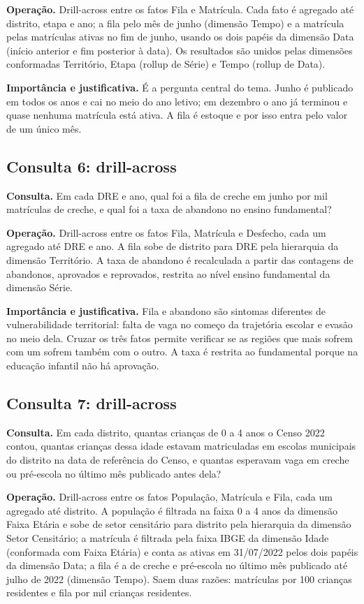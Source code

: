 \documentclass[11pt,a4paper]{article}
\begin{document}
\textbf{Operação.} Drill-across entre os fatos Fila e Matrícula. Cada fato é agregado até distrito, etapa e ano; a fila pelo mês de junho (dimensão Tempo) e a matrícula pelas matrículas ativas no fim de junho, usando os dois papéis da dimensão Data (início anterior e fim posterior à data). Os resultados são unidos pelas dimensões conformadas Território, Etapa (rollup de Série) e Tempo (rollup de Data).

\textbf{Importância e justificativa.} É a pergunta central do tema. Junho é publicado em todos os anos e cai no meio do ano letivo; em dezembro o ano já terminou e quase nenhuma matrícula está ativa. A fila é estoque e por isso entra pelo valor de um único mês.

\subsection{Consulta 6: drill-across}
\textbf{Consulta.} Em cada DRE e ano, qual foi a fila de creche em junho por mil matrículas de creche, e qual foi a taxa de abandono no ensino fundamental?

\textbf{Operação.} Drill-across entre os fatos Fila, Matrícula e Desfecho, cada um agregado até DRE e ano. A fila sobe de distrito para DRE pela hierarquia da dimensão Território. A taxa de abandono é recalculada a partir das contagens de abandonos, aprovados e reprovados, restrita ao nível ensino fundamental da dimensão Série.

\textbf{Importância e justificativa.} Fila e abandono são sintomas diferentes de vulnerabilidade territorial: falta de vaga no começo da trajetória escolar e evasão no meio dela. Cruzar os três fatos permite verificar se as regiões que mais sofrem com um sofrem também com o outro. A taxa é restrita ao fundamental porque na educação infantil não há aprovação.

\subsection{Consulta 7: drill-across}
\textbf{Consulta.} Em cada distrito, quantas crianças de 0 a 4 anos o Censo 2022 contou, quantas crianças dessa idade estavam matriculadas em escolas municipais do distrito na data de referência do Censo, e quantas esperavam vaga em creche ou pré-escola no último mês publicado antes dela?

\textbf{Operação.} Drill-across entre os fatos População, Matrícula e Fila, cada um agregado até distrito. A população é filtrada na faixa 0 a 4 anos da dimensão Faixa Etária e sobe de setor censitário para distrito pela hierarquia da dimensão Setor Censitário; a matrícula é filtrada pela faixa IBGE da dimensão Idade (conformada com Faixa Etária) e conta as ativas em 31/07/2022 pelos dois papéis da dimensão Data; a fila é a de creche e pré-escola no último mês publicado até julho de 2022 (dimensão Tempo). Saem duas razões: matrículas por 100 crianças residentes e fila por mil crianças residentes.
\end{document}
